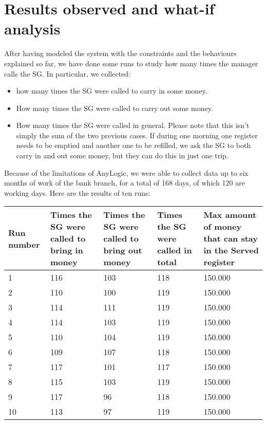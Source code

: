 \documentclass{article}
\begin{document}
\section{Results observed and what-if analysis}
After having modeled the system with the constraints and the behaviours explained so far, we have done some runs to study how many times the manager calls the SG. In particular, we collected:
\begin{itemize}
    \item how many times the SG were called to carry in some money.
    \item How many times the SG were called to carry out some money.
    \item How many times the SG were called in general. Please note that this isn't simply the sum of the two previous cases. If during one morning one register needs to be emptied and another one to be refilled, we ask the SG to both carry in and out some money, but they can do this in just one trip.
\end{itemize}
Because of the limitations of AnyLogic, we were able to collect data up to six months of work of the bank branch, for a total of 168 days, of which 120 are working days. Here are the results of ten runs:
\begin{center}
\begin{tabular}{ | m{2cm} | m{2.5cm}| m{2.5cm} | m{2.5cm} | m{3cm} |}
 \hline
 Run number & Times the SG were called to bring in money & Times the SG were called to bring out money & Times the SG were called in total & Max amount of money that can stay in the Served register\\
 \hline
 1 & 116 & 103 & 118 & 150.000\\
 \hline
 2 & 110 & 100 & 119 & 150.000\\
 \hline
 3 & 114 & 111 & 119 & 150.000\\
 \hline
 4 & 114 & 103 & 119 & 150.000\\
 \hline
 5 & 110 & 104 & 119 & 150.000\\
 \hline
 6 & 109 & 107 & 118 & 150.000\\
 \hline
 7 & 117 & 101 & 117 & 150.000\\
 \hline
 8 & 115 & 103 & 119 & 150.000\\
 \hline
 9 & 117 & 96 & 118 & 150.000\\
 \hline
 10 & 113 & 97 & 119 & 150.000\\
 \hline
\end{tabular}
\end{center}
\end{document}
